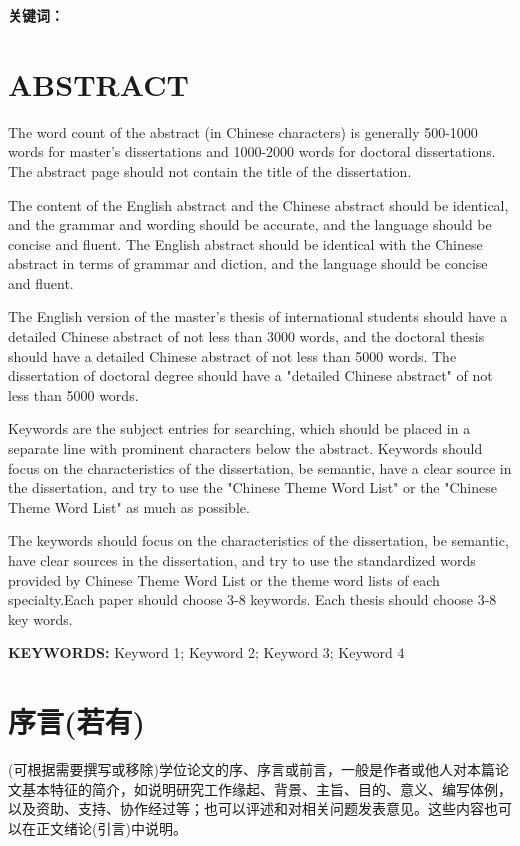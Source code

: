 {\bfseries 关键词：}\KeyWords




\chapter*{ABSTRACT}
The word count of the abstract (in Chinese characters) is generally 500-1000 words for master's dissertations and 1000-2000 words for doctoral dissertations.
The abstract page should not contain the title of the dissertation.

The content of the English abstract and the Chinese abstract should be identical, and the grammar and wording should be accurate, and the language should be concise and fluent.
The English abstract should be identical with the Chinese abstract in terms of grammar and diction, and the language should be concise and fluent.

The English version of the master's thesis of international students should have a detailed Chinese abstract of not less than 3000 words, and the doctoral thesis should have a detailed Chinese abstract of not less than 5000 words.
The dissertation of doctoral degree should have a "detailed Chinese abstract" of not less than 5000 words.

Keywords are the subject entries for searching, which should be placed in a separate line with prominent characters below the abstract.
Keywords should focus on the characteristics of the dissertation, be semantic, have a clear source in the dissertation, and try to use the "Chinese Theme Word List" or the "Chinese Theme Word List" as much as possible.

The keywords should focus on the characteristics of the dissertation, be semantic, have clear sources in the dissertation, and try to use the standardized words provided by Chinese Theme Word List or the theme word lists of each specialty.Each paper should choose 3-8 keywords.
Each thesis should choose 3-8 key words.


{\bfseries KEYWORDS: }Keyword 1; Keyword 2; Keyword 3; Keyword 4




\chapter*{序言(若有)}
(可根据需要撰写或移除)学位论文的序、序言或前言，一般是作者或他人对本篇论文基本特征的简介，如说明研究工作缘起、背景、主旨、目的、意义、编写体例，以及资助、支持、协作经过等；也可以评述和对相关问题发表意见。这些内容也可以在正文绪论(引言)中说明。







